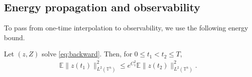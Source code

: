\documentclass[print,wide]{draft}
\begin{document}
\subsection{Energy propagation and observability}

To pass from one-time interpolation to observability, we use the following
energy bound.

\begin{lemma}\label{lem:energy-propagation}
Let $(z,Z)$ solve \eqref{eq:backward}.  Then, for
$0\leq t_1<t_2\leq T$,
\begin{align}\label{eq:energy-propagation}
\mathbb{E}\lVert z(t_1)\rVert_{L^2(\mathbb{T}^n)}^2
\leq e^{C_1^2}\mathbb{E}\lVert z(t_2)\rVert_{L^2(\mathbb{T}^n)}^2.
\end{align}
\end{lemma}
\end{document}

